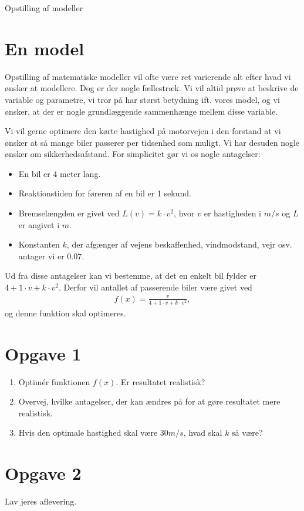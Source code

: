 
\begin{center}
\Huge
Opstilling af modeller
\end{center}

\section*{En model}
Opstilling af matematiske modeller vil ofte være ret varierende alt efter hvad vi ønsker at modellere. Dog er der nogle fællestræk. Vi vil altid prøve at beskrive de variable og parametre, vi tror på har størst betydning ift. vores model, og vi ønsker, at der er nogle grundlæggende sammenhænge mellem disse variable. 
\begin{exa}
Vi vil gerne optimere den kørte hastighed på motorvejen i den forstand at vi ønsker at så mange biler passerer per tidsenhed som muligt. Vi har desuden nogle ønsker om sikkerhedsafstand. For simplicitet gør vi os nogle antagelser: 
\begin{itemize}
\item En bil er 4 meter lang.
\item Reaktionstiden for føreren af en bil er 1 sekund.
\item Bremselængden er givet ved $L(v) = k\cdot v^2$, hvor $v$ er hastigheden i $m/s$ og $L$ er angivet i $m$. 
\item Konstanten $k$, der afgænger af vejens beskaffenhed, vindmodstand, vejr osv. antager vi er $0.07$. 
\end{itemize}
Ud fra disse antagelser kan vi bestemme, at det en enkelt bil fylder er $4+1\cdot v + k\cdot v^2$. Derfor vil antallet af passerende biler være givet ved
\begin{align*}
f(x) = \frac{v}{4+1\cdot v + k\cdot v^2},
\end{align*}
og denne funktion skal optimeres.
\end{exa}

\section*{Opgave 1}
\begin{enumerate}[label=\roman*)]
\item Optimér funktionen $f(x)$. Er resultatet realistisk?
\item Overvej, hvilke antagelser, der kan ændres på for at gøre resultatet mere realistisk.
\item Hvis den optimale hastighed skal være $30m/s$, hvad skal $k$ så være?
\end{enumerate}

\section*{Opgave 2}
Lav jeres aflevering.